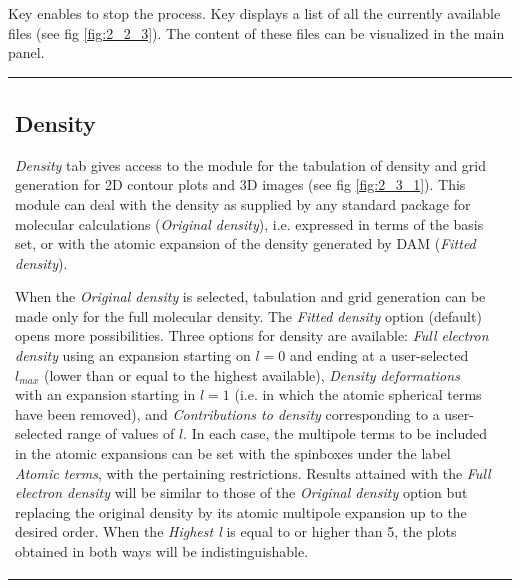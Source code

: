 \documentclass[10pt]{article}
\begin{document}
Key \stopkeya enables to stop the process. Key \listados displays a list of all
the currently available \out{ } files (see fig \ref{fig:2_2_3}). The
content of these files can be visualized in the main panel.


\vspace*{5mm}

\begin{tabular}{lr}
\hspace*{-3mm}
\begin{minipage}{.6\linewidth}

\subsection{Density \label{sec:2.3}\index{density}}

{\it Density} tab gives access to the module for the tabulation of density
and grid generation for 2D contour plots and 3D images (see fig
\ref{fig:2_3_1}).
This module can deal with the density as supplied by any standard package for
molecular calculations ({\it Original density}), i.e. expressed in terms of the
basis set, or with the atomic expansion of the density generated by DAM
({\it Fitted density})\index{density!options}.

When the {\it Original density}\index{density!original} is selected, tabulation
and grid generation can be made only for the full molecular density. The 
{\it Fitted density}\index{density!fitted density} option
(default) opens more possibilities. 
Three options for density are available: {\it Full electron density}\index{density!full electron density} using an expansion 
starting on $l = 0$ and ending at a user-selected $l_{max}$ (lower than or equal to the highest available),
{\it Density deformations}\index{density!density deformations} with an expansion starting in $l = 1$ (i.e. in which the atomic 
spherical terms
have been removed), and {\it Contributions to density}\index{density!contributions to density} corresponding to a user-selected
range of values of $l$.
In each case, the multipole terms to be
included in the atomic expansions can be set with the spinboxes under the label
{\it Atomic terms}, with the pertaining restrictions. 
Results attained with the {\it Full electron density} will be similar to those of the {\it Original
density} option but replacing the original density by its atomic multipole
expansion up to the desired order. When the {\it Highest l} is equal to or higher than
5, the plots obtained in both ways will be indistinguishable.


\end{minipage}
\end{tabular}
\end{document}
